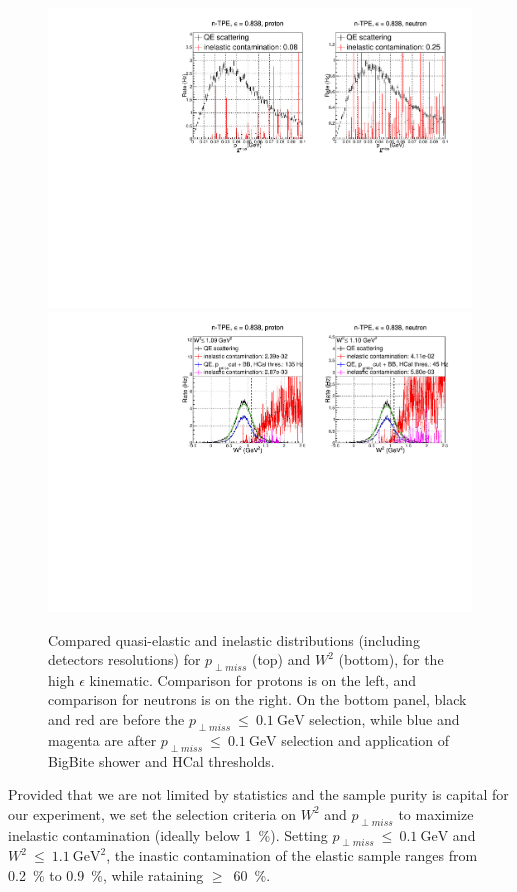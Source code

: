 \begin{figure}[!h]
  \begin{center}
    \includegraphics[width=12cm]{Plots/gen-tpe_he_pperp_acc.pdf}
    \includegraphics[width=12cm]{Plots/gen-tpe_he_W2_acc.pdf}
    \caption{Compared quasi-elastic and inelastic distributions (including detectors resolutions) for $p_{\perp miss}$ (top) and $W^2$ (bottom), for the high $\epsilon$ kinematic. Comparison for protons is on the left, and comparison for neutrons is on the right. On the bottom panel, black and red are before the $p_{\perp miss}~\leq~0.1~\mathrm{GeV}$ selection, while blue and magenta are after $p_{\perp miss}~\leq~0.1~\mathrm{GeV}$ selection and application of BigBite shower and HCal thresholds.}
    \label{fig:inel_contam_he}
  \end{center}
\end{figure}
%
Provided that we are not limited by statistics and the sample purity is capital for our experiment, we set the selection criteria on $W^2$ and $p_{\perp miss}$ to maximize inelastic contamination (ideally below 1~\%). 
Setting $p_{\perp miss}~\leq~0.1~\mathrm{GeV}$ and $W^2~\leq~1.1~\mathrm{GeV}^2$, the inastic contamination of the elastic sample ranges from 0.2~\% to 0.9~\%, while rataining $\geq$~60~\%. %

